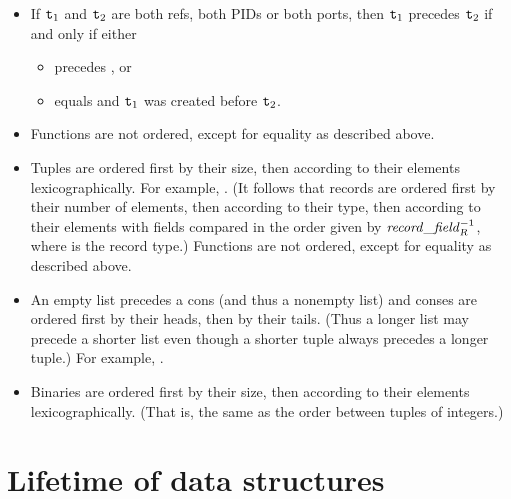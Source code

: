 \begin{itemize}
\item If ${\tt{\sl t}}_1$ and ${\tt{\sl t}}_2$ are both refs, both PIDs or both ports, then
${\tt{\sl t}}_1$ precedes ${\tt{\sl t}}_2$ if and only if
either
\begin{itemize}
\item {} precedes , or
\item {} equals  and ${\tt{\sl t}}_1$ was created before ${\tt{\sl t}}_2$.
\end{itemize}

\ifStd
\item Functions are not ordered, except for equality as described above.
\fi

\item Tuples are ordered first by their size, then according to their elements lexicographically.
For example, .
(It follows that records are ordered first by their number of elements, then according to
their type, then according to their elements with fields compared in the order given by
$\mathit{record\_field}_{\mbox{\scriptsize\tt{\sl{R}}}}^{-1}$, where  is the record type.)
\ifOld
Functions are not ordered, except for equality as described above.
\fi

\item An empty list precedes a cons (and thus a nonempty list) and
conses are ordered first by their heads, then by their tails.
(Thus a longer list may precede a shorter list even though a shorter tuple
always precedes a longer tuple.)  For example,
\T{[] < [a|2] < [a|b] < [a] < [a,a] < [b]}.

\item Binaries are ordered first by their size, then according to their elements lexicographically.
(That is, the same as the order between tuples of integers.)
\end{itemize}

\section{Lifetime of data structures}

\label{section:life-time}

